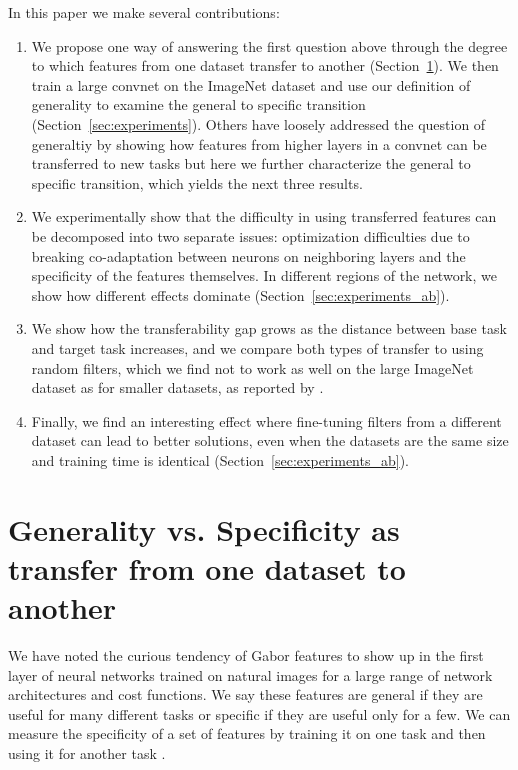 In this paper we make several contributions:

\begin{enumerate}
\item We propose one way of answering the first question above through the degree to which features from one dataset transfer to another (Section~\ref{sec:definition}). We then train a large convnet on the ImageNet dataset and use our definition of generality to examine the general to specific transition (Section~\ref{sec:experiments}).
Others have loosely addressed the question of generaltiy by showing how features from higher layers in a convnet can be transferred to new tasks \cite{donahue+jia-2013-arxiv} but here we further characterize the general to specific transition, which yields the next three results.
\item We experimentally show that the difficulty in using transferred features can be decomposed into two separate issues: optimization difficulties due to breaking co-adaptation between neurons on neighboring layers and the specificity of the features themselves. In different regions of the network, we show how different effects dominate (Section~\ref{sec:experiments_ab}).
\item We show how the transferability gap grows as the distance between base
task and target task increases, and we compare both types of transfer to using random filters, which we find not to work as well on the large ImageNet dataset as for smaller datasets, as reported by \cite{Jarrett-ICCV2009}.
\item Finally, we find an interesting effect where fine-tuning filters from a different dataset can lead to better solutions, even when the datasets are the same size and training time is identical (Section~\ref{sec:experiments_ab}).
\end{enumerate}






\section{Generality vs. Specificity as transfer from one dataset to another}
\label{sec:definition}

We have noted the curious tendency of Gabor features to show up in the first layer of neural networks trained on natural images for a large range of network architectures and cost functions. We say these features are general if they are useful for many different tasks or specific if they are useful only for a few. We can measure the specificity of a set of features by training it on one task \dA and then using it for another task \dB.

